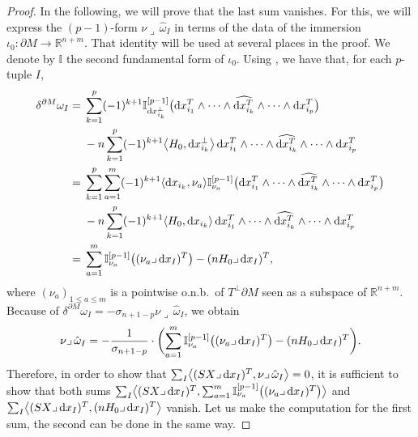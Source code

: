 \begin{proof}
In the following, we will prove that the last sum vanishes.
For this, we will express the $(p-1)$-form $\nu\lrcorner\,\hat{\omega}_I$  in terms of the data of the immersion $\iota_0\colon\partial M\to\mathbb{R}^{n+m}$. That identity will be used at several places in the proof. We denote by $\mathbb{I}$ the second fundamental form of $\iota_0$. Using \cite[equation~(3.3)]{Savo05}, we have that, for each $p$-tuple $I$,
\begin{align}
\delta^{\partial M}\omega_I={} &\sum_{k=1}^p(-1)^{k+1}\mathbb{I}_{{\rm d}x_{i_k}^\perp}^{[p-1]}\bigl({\rm d}x_{i_1}^T\wedge \dots \wedge\widehat{{\rm d}x_{i_k}^T}\wedge\dots \wedge {\rm d}x_{i_p}^T\bigr)\nonumber\\
&{}-n \sum_{k=1}^p(-1)^{k+1}\bigl\langle H_0, {\rm d}x_{i_k}^\perp\bigr\rangle\,{\rm d}x_{i_1}^T\wedge\dots\wedge\widehat{{\rm d}x_{i_k}^T}\wedge\dots \wedge {\rm d}x_{i_p}^T\nonumber\\
 ={} &\sum_{k=1}^p\sum_{a=1}^m(-1)^{k+1}\langle {\rm d}x_{i_k},\nu_a\rangle\mathbb{I}_{\nu_a}^{[p-1]}\bigl({\rm d}x_{i_1}^T\wedge \dots \wedge\widehat{{\rm d}x_{i_k}^T}\wedge\dots \wedge {\rm d}x_{i_p}^T\bigr)\nonumber\\
 &{}-n \sum_{k=1}^p(-1)^{k+1}\langle H_0, {\rm d}x_{i_k}\rangle\,{\rm d}x_{i_1}^T\wedge\dots\wedge\widehat{{\rm d}x_{i_k}^T}\wedge\dots \wedge {\rm d}x_{i_p}^T\nonumber\\
 ={}&\sum_{a=1}^m\mathbb{I}_{\nu_a}^{[p-1]}\bigl((\nu_a\lrcorner\,{\rm d}x_I)^T\bigr)-(nH_0\lrcorner\,{\rm d}x_I)^T,\label{eq:deltaomegaISavo}
\end{align}
where $(\nu_a)_{1\leq a\leq m}$ is a pointwise o.n.b.\ of $T^\perp \partial M$ seen as a subspace of $\mathbb{R}^{n+m}$. Because of $\delta^{\partial M}\omega_I=-\sigma_{n+1-p}\nu\lrcorner\,\hat{\omega}_I$, we obtain
\begin{equation}\label{eq:nuinterioromega}
\nu\lrcorner\,\hat{\omega}_I=-\frac{1}{\sigma_{n+1-p}}\cdot\biggl(\sum_{a=1}^m\mathbb{I}_{\nu_a}^{[p-1]}\bigl((\nu_a\lrcorner\,{\rm d}x_I)^T\bigr)-(nH_0\lrcorner\,{\rm d}x_I)^T\biggr).
\end{equation}
Therefore, in order to show that $\sum_I\bigl\langle (SX\lrcorner\,{\rm d}x_I)^T,\nu\lrcorner\,\hat{\omega}_I\bigr\rangle=0$, it is sufficient to show that both sums $\sum_I\bigl\langle (SX\lrcorner\,{\rm d}x_I)^T,\sum_{a=1}^m\mathbb{I}_{\nu_a}^{[p-1]}\bigl((\nu_a\lrcorner\,{\rm d}x_I)^T\bigr)\bigr\rangle$ and $\sum_I\bigl\langle (SX\lrcorner\,{\rm d}x_I)^T,(nH_0\lrcorner\,{\rm d}x_I)^T\bigr\rangle$ vanish.
Let us make the computation for the first sum, the second can be done in the same way.

\end{proof}
